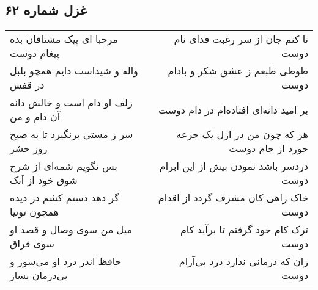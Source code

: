 \begin{center}
\section*{غزل شماره ۶۲}
\label{sec:sh062}
\begin{longtable}{l p{0.5cm} r}
مرحبا ای پیک مشتاقان بده پیغام دوست
&&
تا کنم جان از سر رغبت فدای نام دوست
\\
واله و شیداست دایم همچو بلبل در قفس
&&
طوطی طبعم ز عشق شکر و بادام دوست
\\
زلف او دام است و خالش دانه آن دام و من
&&
بر امید دانه‌ای افتاده‌ام در دام دوست
\\
سر ز مستی برنگیرد تا به صبح روز حشر
&&
هر که چون من در ازل یک جرعه خورد از جام دوست
\\
بس نگویم شمه‌ای از شرح شوق خود از آنک
&&
دردسر باشد نمودن بیش از این ابرام دوست
\\
گر دهد دستم کشم در دیده همچون توتیا
&&
خاک راهی کان مشرف گردد از اقدام دوست
\\
میل من سوی وصال و قصد او سوی فراق
&&
ترک کام خود گرفتم تا برآید کام دوست
\\
حافظ اندر درد او می‌سوز و بی‌درمان بساز
&&
زان که درمانی ندارد درد بی‌آرام دوست
\\
\end{longtable}
\end{center}
